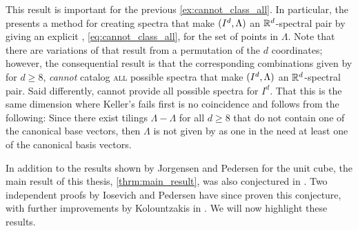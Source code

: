 \documentclass[../thesis.tex]{subfiles}
\begin{document}
This result is important for the previous \cref{ex:cannot_class_all}. In particular, the  presents a method for creating spectra that make $(I^d,\Lambda)$ an $\mathbb{R}^d$-spectral pair by giving an explicit , \cref{eq:cannot_class_all}, for the set of points in $\Lambda$. Note that there are variations of  that result from a permutation of the $d$ coordinates; however, the consequential result is that the corresponding combinations given by  for $d\geq8$, \emph{cannot} catalog \textsc{all} possible spectra that make $(I^d,\Lambda)$ an $\mathbb{R}^d$-spectral pair. Said differently,  cannot provide all possible spectra for $I^d$. That this is the same dimension where Keller's  fails first is no coincidence and follows from the following: Since there exist tilings $\Lambda-\Lambda$ for all $d\geq8$ that do not contain one of the canonical base vectors, then $\Lambda$ is  not given by  as one in the  need at least one of the canonical basis vectors.

In addition to the results shown by Jorgensen and Pedersen for the unit cube, the main result of this thesis, \cref{thrm:main_result}, was also conjectured in \cite{jorgensenSpectralPairsCartesian2001}. Two independent proofs by Iosevich and Pedersen \cite{iosevichSpectralTilingProperties1998} have since proven this conjecture, with further improvements by Kolountzakis in \cite{kolountzakisPackingTilingOrthogonality2000}. We will now highlight these results. 
\end{document}
